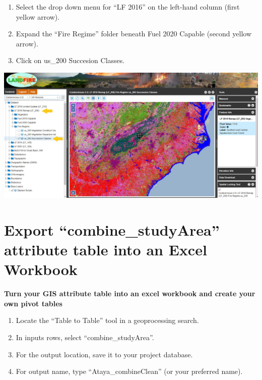\documentclass[
]{book}
\providecommand{\tightlist}{%
  \setlength{\itemsep}{0pt}\setlength{\parskip}{0pt}}
\begin{document}
\begin{enumerate}
\def\labelenumi{\arabic{enumi}.}
\tightlist
\item
  Select the drop down menu for ``LF 2016'' on the left-hand column (first yellow arrow).
\item
  Expand the ``Fire Regime'' folder beneath Fuel 2020 Capable (second yellow arrow).
\item
  Click on us\_200 Succesion Classes.
\end{enumerate}

\includegraphics[width=1000px]{KP_screenshots/LANDFIRE Find sClass}

\hypertarget{export-combine_studyarea-attribute-table-into-an-excel-workbook}{%
\section{Export ``combine\_studyArea'' attribute table into an Excel Workbook}\label{export-combine_studyarea-attribute-table-into-an-excel-workbook}}

\textbf{Turn your GIS attribute table into an excel workbook and create your own pivot tables}

\begin{enumerate}
\def\labelenumi{\arabic{enumi}.}
\tightlist
\item
  Locate the ``Table to Table'' tool in a geoprocessing search.
\item
  In inputs rows, select ``combine\_studyArea''.
\item
  For the output location, save it to your project database.
\item
  For output name, type ``Ataya\_combineClean'' (or your preferred name).
\end{enumerate}
\end{document}
